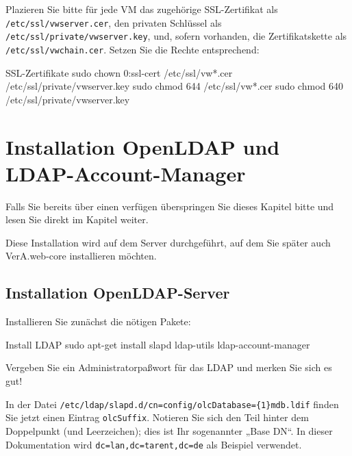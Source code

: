 Plazieren Sie bitte für jede VM das zugehörige SSL-Zertifikat als
\texttt{/etc/ssl/vwserver.cer}, den privaten Schlüssel als
\texttt{/etc/ssl/private/vwserver.key}, und, sofern vorhanden, die
Zertifikatskette als \texttt{/etc/ssl/vwchain.cer}. Setzen Sie die
Rechte entsprechend:\keinumbruch

\begin{minipage}{\textwidth}
\begin{lstdump}{SSL-Zertifikate}
sudo chown 0:ssl-cert /etc/ssl/vw*.cer /etc/ssl/private/vwserver.key
sudo chmod 644 /etc/ssl/vw*.cer
sudo chmod 640 /etc/ssl/private/vwserver.key
\end{lstdump}
\end{minipage}

\section{Installation OpenLDAP und LDAP-Account-Manager}\label{sec:setup-lam}

Falls Sie bereits über einen  verfügen
überspringen Sie dieses Kapitel bitte und lesen Sie direkt im Kapitel
\ifoa
\else%
\fi%
weiter.

Diese Installation wird auf dem Server durchgeführt, auf dem Sie
später auch VerA.web-core installieren möchten.

\subsection{Installation OpenLDAP-Server}\label{subsec:setup-lam-slapd}

\begin{minipage}{\textwidth}
Installieren Sie zunächst die nötigen Pakete:

\begin{lstdump}{Install LDAP}
sudo apt-get install slapd ldap-utils ldap-account-manager
\end{lstdump}

Vergeben Sie ein Administratorpaßwort für das LDAP und merken
Sie sich es gut!
\end{minipage}

In der Datei \texttt{/etc/ldap/slapd.d/cn=config/olcDatabase=\{1\}mdb.ldif}
finden Sie jetzt einen Eintrag \texttt{olcSuffix}. Notieren Sie sich den
Teil hinter dem Doppelpunkt (und Leerzeichen); dies ist Ihr sogenannter
„Base DN“. In dieser Dokumentation wird \texttt{dc=lan,dc=tarent,dc=de} als
Beispiel verwendet.

